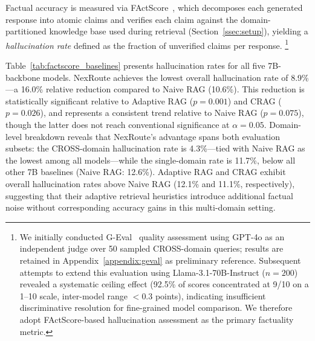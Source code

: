 \documentclass[a4paper,fleql]{cas-sc}
\begin{document}
Factual accuracy is measured via FActScore~\citep{min2023factscore}, which
decomposes each generated response into atomic claims and verifies each claim
against the domain-partitioned knowledge base used during retrieval
(Section~\ref{ssec:setup}), yielding a \emph{hallucination rate} defined
as the fraction of unverified claims per response.%
\footnote{%
  We initially conducted G-Eval~\citep{liu2023geval} quality assessment using
  GPT-4o as an independent judge over 50 sampled CROSS-domain queries; results
  are retained in Appendix~\ref{appendix:geval} as preliminary reference.
  Subsequent attempts to extend this evaluation using
  Llama-3.1-70B-Instruct ($n{=}200$) revealed a systematic ceiling effect
  (92.5\% of scores concentrated at 9/10 on a 1--10 scale,
  inter-model range $<$0.3 points), indicating insufficient discriminative
  resolution for fine-grained model comparison.
  We therefore adopt FActScore-based hallucination assessment as the primary
  factuality metric.
}

Table~\ref{tab:factscore_baselines} presents hallucination rates for all five
7B-backbone models.
NexRoute achieves the lowest overall hallucination rate of 8.9\%---a 16.0\%
relative reduction compared to Naive RAG (10.6\%).
This reduction is statistically significant relative to Adaptive RAG
($p{=}0.001$) and CRAG ($p{=}0.026$), and represents a consistent trend
relative to Naive RAG ($p{=}0.075$), though the latter does not reach
conventional significance at $\alpha{=}0.05$.
Domain-level breakdown reveals that NexRoute's advantage spans both evaluation
subsets: the CROSS-domain hallucination rate is 4.3\%---tied with Naive RAG
as the lowest among all models---while the single-domain rate is 11.7\%,
below all other 7B baselines (Naive RAG: 12.6\%).
Adaptive RAG and CRAG exhibit overall hallucination rates above Naive RAG
(12.1\% and 11.1\%, respectively), suggesting that their adaptive retrieval
heuristics introduce additional factual noise without corresponding accuracy
gains in this multi-domain setting.
\end{document}
